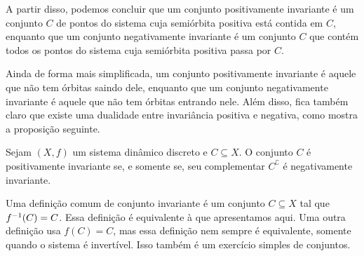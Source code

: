 A partir disso, podemos concluir que um conjunto positivamente invariante é um conjunto $C$ de pontos do sistema cuja semiórbita positiva está contida em $C$, enquanto que um conjunto negativamente invariante é um conjunto $C$ que contém todos os pontos do sistema cuja semiórbita positiva passa por $C$.

Ainda de forma mais simplificada, um conjunto positivamente invariante é aquele que não tem órbitas saindo dele, enquanto que um conjunto negativamente invariante é aquele que não tem órbitas entrando nele. Além disso, fica também claro que existe uma dualidade entre invariância positiva e negativa, como mostra a proposição seguinte.

\begin{proposition}
Sejam $(X,f)$ um sistema dinâmico discreto e $C \subseteq X$. O conjunto $C$ é positivamente invariante se, e somente se, seu complementar $C^\complement$ é negativamente invariante.
\end{proposition}

Uma definição comum de conjunto invariante é um conjunto $C \subseteq X$ tal que $f^{-1}(C) = C$. Essa definição é equivalente à que apresentamos aqui. Uma outra definição usa $f(C) = C$, mas essa definição nem sempre é equivalente, somente quando o sistema é invertível. Isso também é um exercício simples de conjuntos.


